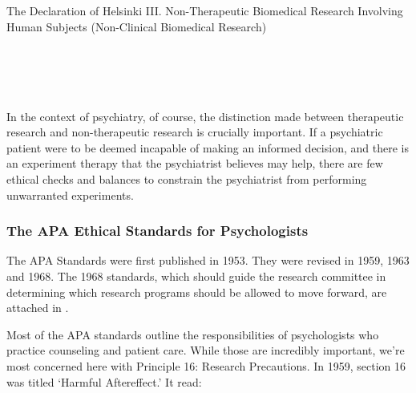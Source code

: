 \begin{refsection}
\begin{apatextbox}{The Declaration of Helsinki}
III. Non-Therapeutic Biomedical Research Involving Human Subjects (Non-Clinical Biomedical Research) \\

\\

\\

\\

\\

 \end{apatextbox}

In the context of psychiatry, of course, the distinction made between therapeutic research and non-therapeutic research is crucially important. If a psychiatric patient were to be deemed incapable of making an informed decision, and there is an experiment therapy that the psychiatrist believes may help, there are few ethical checks and balances to constrain the psychiatrist from performing unwarranted experiments.

\subsubsection{The APA Ethical Standards for Psychologists}
\label{theapaethicalstandardsforpsychologists}

The APA Standards were first published in 1953. They were revised in 1959, 1963 and 1968. The 1968 standards, which should guide the research committee in determining which research programs should be allowed to move forward, are attached in .

Most of the APA standards outline the responsibilities of psychologists who practice counseling and patient care. While those are incredibly important, we're most concerned here with Principle 16: Research Precautions. In 1959, section 16 was titled `Harmful Aftereffect.' It read:


\end{refsection}
